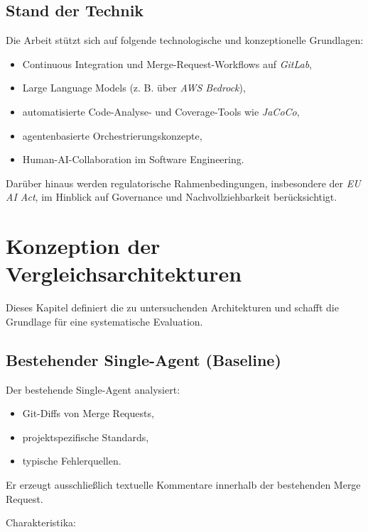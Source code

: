 \subsection{Stand der Technik}

Die Arbeit stützt sich auf folgende technologische und konzeptionelle Grundlagen:

\begin{itemize}
	\item Continuous Integration und Merge-Request-Workflows auf \textit{GitLab},
	\item Large Language Models (z. B. über \textit{AWS Bedrock}),
	\item automatisierte Code-Analyse- und Coverage-Tools wie \textit{JaCoCo},
	\item agentenbasierte Orchestrierungskonzepte,
	\item Human-AI-Collaboration im Software Engineering.
\end{itemize}

Darüber hinaus werden regulatorische Rahmenbedingungen, insbesondere der \textit{EU AI Act}, im Hinblick auf Governance und Nachvollziehbarkeit berücksichtigt.



\section{Konzeption der Vergleichsarchitekturen}

Dieses Kapitel definiert die zu untersuchenden Architekturen und schafft die Grundlage für eine systematische Evaluation.



\subsection{Bestehender Single-Agent (Baseline)}

Der bestehende Single-Agent analysiert:

\begin{itemize}
	\item Git-Diffs von Merge Requests,
	\item projektspezifische Standards,
	\item typische Fehlerquellen.
\end{itemize}

Er erzeugt ausschließlich textuelle Kommentare innerhalb der bestehenden Merge Request.

Charakteristika:

